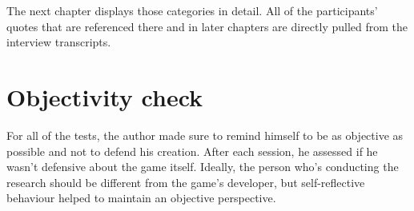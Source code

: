 The next chapter displays those categories in detail.
All of the participants' quotes that are referenced there and in later chapters are directly pulled from the interview transcripts. 


\section{Objectivity check}

For all of the tests, the author made sure to remind himself to be as objective as possible and not to defend his creation.
After each session, he assessed if he wasn't defensive about the game itself.
Ideally, the person who's conducting the research should be different from the game's developer, but self-reflective behaviour helped to maintain an objective perspective.
